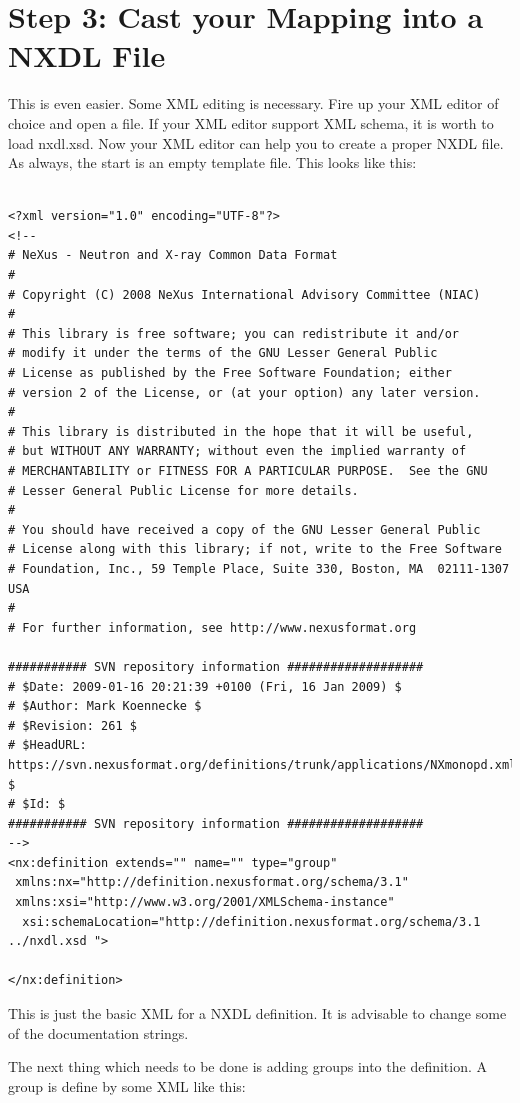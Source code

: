 \documentclass[a4paper]{article}\usepackage[dvips]{graphicx}
\begin{document}
\section{Step 3: Cast your Mapping into a NXDL File }

This is even easier. Some XML editing is necessary. Fire up your XML editor of choice and open a file. 
If your XML editor support XML schema, it is worth to load nxdl.xsd. Now your XML editor can help you to 
create a proper NXDL file. As always, the start is an empty template file. This looks like this:


\begin{verbatim}

<?xml version="1.0" encoding="UTF-8"?>
<!--
# NeXus - Neutron and X-ray Common Data Format
# 
# Copyright (C) 2008 NeXus International Advisory Committee (NIAC)
# 
# This library is free software; you can redistribute it and/or
# modify it under the terms of the GNU Lesser General Public
# License as published by the Free Software Foundation; either
# version 2 of the License, or (at your option) any later version.
#
# This library is distributed in the hope that it will be useful,
# but WITHOUT ANY WARRANTY; without even the implied warranty of
# MERCHANTABILITY or FITNESS FOR A PARTICULAR PURPOSE.  See the GNU
# Lesser General Public License for more details.
#
# You should have received a copy of the GNU Lesser General Public
# License along with this library; if not, write to the Free Software
# Foundation, Inc., 59 Temple Place, Suite 330, Boston, MA  02111-1307  USA
#
# For further information, see http://www.nexusformat.org

########### SVN repository information ###################
# $Date: 2009-01-16 20:21:39 +0100 (Fri, 16 Jan 2009) $
# $Author: Mark Koennecke $
# $Revision: 261 $
# $HeadURL: https://svn.nexusformat.org/definitions/trunk/applications/NXmonopd.xml $
# $Id: $
########### SVN repository information ###################
-->
<nx:definition extends="" name="" type="group" 
 xmlns:nx="http://definition.nexusformat.org/schema/3.1" 
 xmlns:xsi="http://www.w3.org/2001/XMLSchema-instance" 
  xsi:schemaLocation="http://definition.nexusformat.org/schema/3.1 ../nxdl.xsd ">

</nx:definition>
\end{verbatim}
 
This is just the basic XML for a NXDL definition. It is advisable to change some of 
the documentation strings. 


The next thing which needs to be done is adding groups into the definition. A group is 
define by some XML like this:
\end{document}
